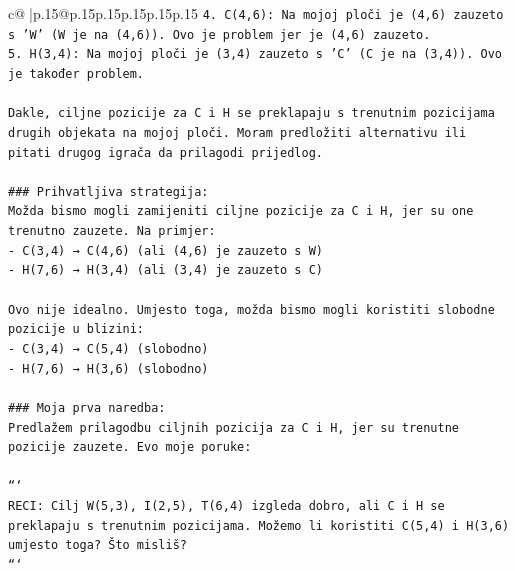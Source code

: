 \documentclass{article}
\begin{document}
{\begin{supertabular}{c@{$\;$}|p{.15\linewidth}@{}p{.15\linewidth}p{.15\linewidth}p{.15\linewidth}p{.15\linewidth}p{.15\linewidth}}
{{{\texttt{4. C(4,6): Na mojoj ploči je (4,6) zauzeto s 'W' (W je na (4,6)). Ovo je problem jer je (4,6) zauzeto.} \\
\texttt{5. H(3,4): Na mojoj ploči je (3,4) zauzeto s 'C' (C je na (3,4)). Ovo je također problem.} \\
\\ 
\texttt{Dakle, ciljne pozicije za C i H se preklapaju s trenutnim pozicijama drugih objekata na mojoj ploči. Moram predložiti alternativu ili pitati drugog igrača da prilagodi prijedlog.} \\
\\ 
\texttt{\#\#\# Prihvatljiva strategija:} \\
\texttt{Možda bismo mogli zamijeniti ciljne pozicije za C i H, jer su one trenutno zauzete. Na primjer:} \\
\texttt{{-} C(3,4) → C(4,6) (ali (4,6) je zauzeto s W)} \\
\texttt{{-} H(7,6) → H(3,4) (ali (3,4) je zauzeto s C)} \\
\\ 
\texttt{Ovo nije idealno. Umjesto toga, možda bismo mogli koristiti slobodne pozicije u blizini:} \\
\texttt{{-} C(3,4) → C(5,4) (slobodno)} \\
\texttt{{-} H(7,6) → H(3,6) (slobodno)} \\
\\ 
\texttt{\#\#\# Moja prva naredba:} \\
\texttt{Predlažem prilagodbu ciljnih pozicija za C i H, jer su trenutne pozicije zauzete. Evo moje poruke:} \\
\\ 
\texttt{```} \\
\texttt{RECI: Cilj W(5,3), I(2,5), T(6,4) izgleda dobro, ali C i H se preklapaju s trenutnim pozicijama. Možemo li koristiti C(5,4) i H(3,6) umjesto toga? Što misliš?} \\
\texttt{```} \\
            }
        }
    }
     \\ \\


\end{supertabular}}
\end{document}
